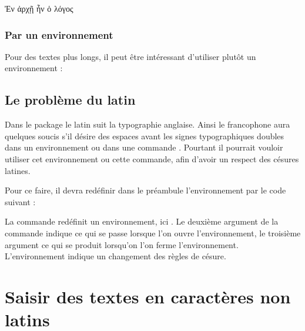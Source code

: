 \begin{latexcode}
\textgreek[variant=ancient]{Ἐν ἀρχῇ ἦν ὁ λόγος}
\end{latexcode}

\subsubsection{Par un environnement}

Pour des textes plus longs, il peut être intéressant d'utiliser plutôt un environnement :


\subsection{Le problème du latin}\label{redefinirlatin}

Dans le package  le latin suit la typographie anglaise. Ainsi le francophone aura quelques soucis s'il désire des espaces avant les signes typographiques doubles dans un environnement  ou dans une commande .
Pourtant il pourrait vouloir utiliser cet environnement ou cette commande, afin d'avoir un respect des césures latines.

Pour ce faire, il devra redéfinir dans le préambule l'environnement  par le code suivant :

\begin{latexcode}
\renewenvironment{latin}{\begin{hyphenrules}{latin}}%
{\end{hyphenrules}}
\end{latexcode}

\begin{plusloins}
La commande  redéfinit un environnement, ici . Le deuxième argument de la commande indique ce qui se passe lorsque l'on ouvre l'environnement, le troisième argument ce qui se produit lorsqu'on l'on ferme l'environnement. L'environnement  indique un changement des règles de césure.
\end{plusloins}


\section{Saisir des textes en caractères non latins}\label{utf8}

